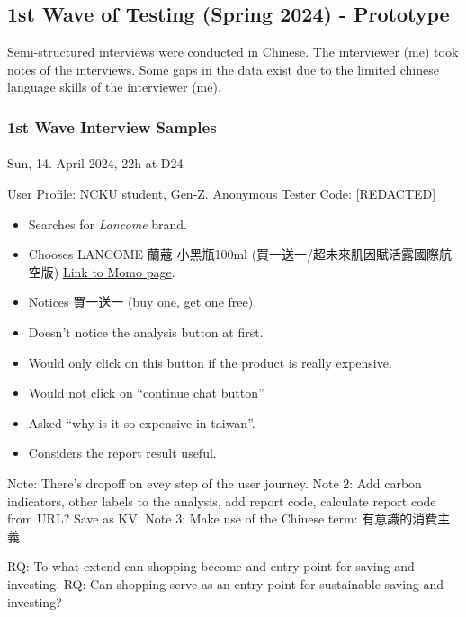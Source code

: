 \documentclass[
  12pt,
  letterpaper,
  DIV=11,
  numbers=noendperiod]{scrartcl}
\makeatletter
\let\oldparagraph\paragraph
\renewcommand{\paragraph}{
    \@ifstar
      \xxxParagraphStar
      \xxxParagraphNoStar
  }
\newcommand{\xxxParagraphStar}[1]{\oldparagraph*{#1}\mbox{}}
\newcommand{\xxxParagraphNoStar}[1]{\oldparagraph{#1}\mbox{}}
\providecommand{\tightlist}{%
  \setlength{\itemsep}{0pt}\setlength{\parskip}{0pt}}
\makeatother
\begin{document}
\subsection{1st Wave of Testing (Spring 2024) -
Prototype}\label{st-wave-of-testing-spring-2024---prototype}

Semi-structured interviews were conducted in Chinese. The interviewer
(me) took notes of the interviews. Some gaps in the data exist due to
the limited chinese language skills of the interviewer (me).

\subsubsection{1st Wave Interview
Samples}\label{st-wave-interview-samples}

\paragraph{Sun, 14. April 2024, 22h at
D24}\label{sun-14.-april-2024-22h-at-d24}

User Profile: NCKU student, Gen-Z. Anonymous Tester Code: {[}REDACTED{]}

\begin{itemize}
\tightlist
\item
  Searches for \emph{Lancome} brand.
\item
  Chooses LANCOME 蘭蔻 小黑瓶100ml (買一送一/超未來肌因賦活露國際航空版)
  \href{https://www.momoshop.com.tw/goods/GoodsDetail.jsp?i_code=12028429&Area=search&oid=1_8&cid=index&kw=lancome}{Link
  to Momo page}.
\item
  Notices 買一送一 (buy one, get one free).
\item
  Doesn't notice the analysis button at first.
\item
  Would only click on this button if the product is really expensive.
\item
  Would not click on ``continue chat button''
\item
  Asked ``why is it so expensive in taiwan''.
\item
  Considers the report result useful.
\end{itemize}

Note: There's dropoff on evey step of the user journey. Note 2: Add
carbon indicators, other labels to the analysis, add report code,
calculate report code from URL? Save as KV. Note 3: Make use of the
Chinese term: 有意識的消費主義

RQ: To what extend can shopping become and entry point for saving and
investing. RQ: Can shopping serve as an entry point for sustainable
saving and investing?
\end{document}
